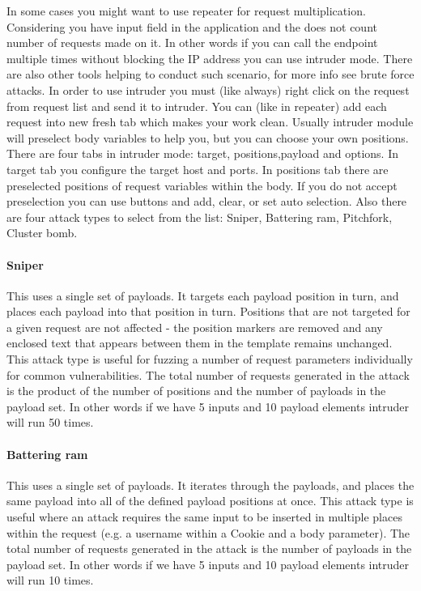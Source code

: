 In some cases you might want to use repeater for request multiplication.
Considering you have input field in the application and the does not count number of requests made on it.
In other words if you can call the endpoint multiple times without blocking the IP address you can use intruder mode.
There are also other tools helping to conduct such scenario, for more info see brute force attacks.\newline \newline
In order to use intruder you must (like always) right click on the request from request list and send it to intruder.
You can (like in repeater) add each request into new fresh tab which makes your work clean.
Usually intruder module will preselect body variables to help you, but you can choose your own positions.
There are four tabs in intruder mode: target, positions,payload and options.
In target tab you configure the target host and ports.
In positions tab there are preselected positions of request variables within the body.
If you do not accept preselection you can use buttons and add, clear, or set auto selection.
Also there are four attack types to select from the list: Sniper, Battering ram, Pitchfork, Cluster bomb.

\paragraph{Sniper}
This uses a single set of payloads.
It targets each payload position in turn, and places each payload into that position in turn.
Positions that are not targeted for a given request are not affected - the position markers are removed and any enclosed text that appears between them in the template remains unchanged.
This attack type is useful for fuzzing a number of request parameters individually for common vulnerabilities.
The total number of requests generated in the attack is the product of the number of positions and the number of payloads in the payload set.
In other words if we have 5 inputs and 10 payload elements intruder will run 50 times.
\paragraph{Battering ram}
This uses a single set of payloads.
It iterates through the payloads, and places the same payload into all of the defined payload positions at once.
This attack type is useful where an attack requires the same input to be inserted in multiple places within the request (e.g. a username within a Cookie and a body parameter).
The total number of requests generated in the attack is the number of payloads in the payload set.
In other words if we have 5 inputs and 10 payload elements intruder will run 10 times.
